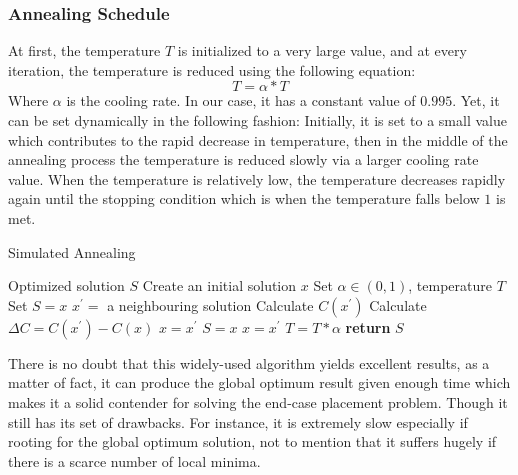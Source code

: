 \documentclass[conference]{IEEEtran}
\begin{document}
\subsubsection{Annealing Schedule}

At first, the temperature $T$ is initialized to a very large value, and at every iteration, the temperature is reduced using the following equation:
\begin{equation}
    T = \alpha*T
\end{equation}
Where $\alpha$ is the cooling rate. In our case, it has a constant value of $0.995$. Yet, it can be set dynamically in the following fashion: Initially, it is set to a small value which contributes to the rapid decrease in temperature, then in the middle of the annealing process the temperature is reduced slowly via a larger cooling rate value. When the temperature is relatively low, the temperature decreases rapidly again until the stopping condition which is when the temperature falls below $1$ is met.

\medskip

\begin{algorithm}[H]
    \caption{Simulated Annealing}
    \begin{algorithmic}[1]
    \renewcommand{\algorithmicrequire}{\textbf{Input:}}
    \renewcommand{\algorithmicensure}{\textbf{Output:}}
    \Ensure  Optimized solution $S$
       \State Create an initial solution $x$
     \State Set $\alpha \in (0,1)$, temperature $T$
     \State Set $S = x$
       \State $x^{'} = $ a neighbouring solution
       \State Calculate $C(x^{'})$
       \State Calculate $\Delta C = C(x^{'}) - C(x)$
           \State $x = x^{'}$
               \State $S = x$
           \EndIf
           \State $x = x^{'}$
       \EndIf
       \State $T = T * \alpha$
     \EndWhile
    \State \textbf{return} $S$
    \end{algorithmic} 
\end{algorithm}

There is no doubt that this widely-used algorithm yields excellent results, as a matter of fact, it can produce the global optimum result given enough time which makes it a solid contender for solving the end-case placement problem. Though it still has its set of drawbacks. For instance, it is extremely slow especially if rooting for the global optimum solution, not to mention that it suffers hugely if there is a scarce number of local minima.
\end{document}
